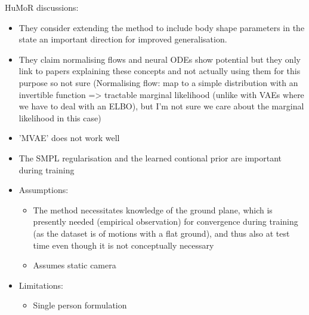 HuMoR discussions:
\begin{itemize}
    \item They consider extending the method to include body shape parameters in the state an important direction for improved generalisation.
    \item They claim normalising flows and neural ODEs show potential but they only link to papers explaining these concepts and not actually using them for this purpose so not sure (Normalising flow: map to a simple distribution with an invertible function => tractable marginal likelihood (unlike with VAEs where we have to deal with an ELBO), but I'm not sure we care about the marginal likelihood in this case)
    \item 'MVAE' does not work well
    \item The SMPL regularisation and the learned contional prior are important during training
    \item Assumptions:
    \begin{itemize}
        \item The method necessitates knowledge of the ground plane, which is presently needed (empirical observation) for convergence during training (as the dataset is of motions with a flat ground), and thus also at test time even though it is not conceptually necessary
        \item Assumes static camera
    \end{itemize}
    \item Limitations:
    \begin{itemize}
        \item Single person formulation
    \end{itemize}
\end{itemize}


